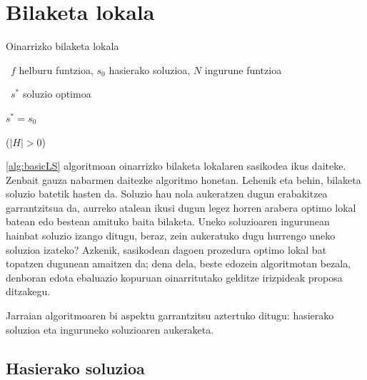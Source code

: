 \documentclass[eu]{ifirak}\usepackage[]{graphicx}\usepackage[]{color}
\begin{document}
\section{Bilaketa lokala}

\begin{ifalgorithm}[t]\label{alg:basicLS}
\begin{ifpseudo}{Oinarrizko bilaketa lokala}
\item \In\ $f$ helburu funtzioa, $s_0$ hasierako soluzioa, $N$ ingurune funtzioa
\item \Out\ $s^*$ soluzio optimoa
\item $s^*=s_0$
\item \Do
\item {}
\item {}
\item {}
\item {}
\item \T{\EIf}
\item \While ($|H|>0$)
\end{ifpseudo}
\caption{Oinarrizko bilaketa lokalaren sasikodea. Uneko soluzioaren ingurunean helburu funtzioa hobetzen duen soluzio bat bilatzen dugu. Horrelakorik badago, uneko soluzioa ordezkatzen dugu; ez badago, bilaketa amaitzen da.}
\end{ifalgorithm}

\ref{alg:basicLS} algoritmoan oinarrizko bilaketa lokalaren sasikodea ikus daiteke. Zenbait gauza nabarmen daitezke algoritmo honetan. Lehenik eta behin, bilaketa soluzio batetik hasten da. Soluzio hau nola aukeratzen dugun erabakitzea garrantzitsua da, aurreko atalean ikusi dugun legez horren arabera optimo lokal batean edo bestean amituko baita bilaketa. Uneko soluzioaren ingurunean hainbat soluzio izango ditugu, beraz, zein aukeratuko dugu hurrengo uneko soluzioa izateko? Azkenik, sasikodean dagoen prozedura optimo lokal bat topatzen dugunean amaitzen da; dena dela, beste edozein algoritmotan bezala, denboran edota ebaluazio kopuruan oinarritutako gelditze irizpideak proposa ditzakegu.

Jarraian algoritmoaren bi aspektu garrantzitsu aztertuko ditugu: hasierako soluzioa eta inguruneko soluzioaren aukeraketa.

\subsection{Hasierako soluzioa}
\end{document}
